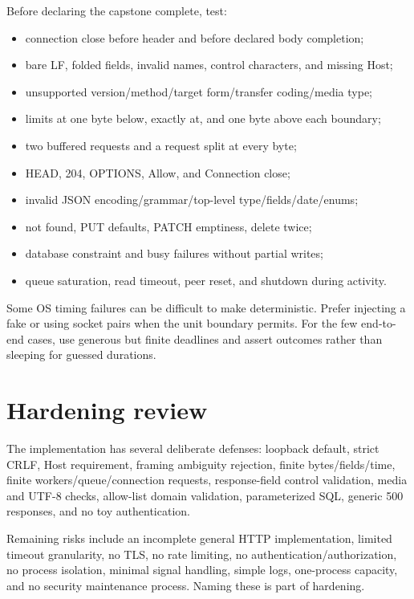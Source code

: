 Before declaring the capstone complete, test:

\begin{itemize}
  \item connection close before header and before declared body completion;
  \item bare LF, folded fields, invalid names, control characters, and missing Host;
  \item unsupported version/method/target form/transfer coding/media type;
  \item limits at one byte below, exactly at, and one byte above each boundary;
  \item two buffered requests and a request split at every byte;
  \item HEAD, 204, OPTIONS, Allow, and Connection close;
  \item invalid JSON encoding/grammar/top-level type/fields/date/enums;
  \item not found, PUT defaults, PATCH emptiness, delete twice;
  \item database constraint and busy failures without partial writes;
  \item queue saturation, read timeout, peer reset, and shutdown during activity.
\end{itemize}

Some OS timing failures can be difficult to make deterministic. Prefer injecting
a fake or using socket pairs when the unit boundary permits. For the few end-to-
end cases, use generous but finite deadlines and assert outcomes rather than
sleeping for guessed durations.

\section{Hardening review}

The implementation has several deliberate defenses: loopback default, strict
CRLF, Host requirement, framing ambiguity rejection, finite bytes/fields/time,
finite workers/queue/connection requests, response-field control validation,
media and UTF-8 checks, allow-list domain validation, parameterized SQL, generic
500 responses, and no toy authentication.

Remaining risks include an incomplete general HTTP implementation, limited
timeout granularity, no TLS, no rate limiting, no authentication/authorization,
no process isolation, minimal signal handling, simple logs, one-process capacity,
and no security maintenance process. Naming these is part of hardening.

